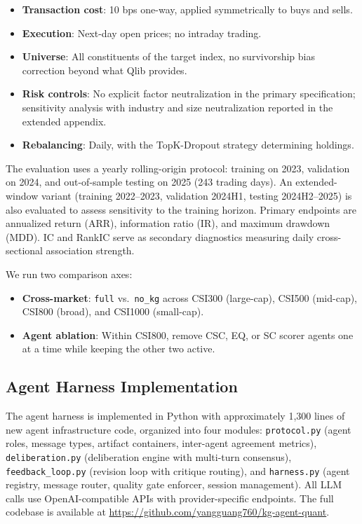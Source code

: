 \documentclass[sigconf]{acmart}
\begin{document}
\begin{itemize}
    \item \textbf{Transaction cost}: 10 bps one-way, applied symmetrically to buys and sells.
    \item \textbf{Execution}: Next-day open prices; no intraday trading.
    \item \textbf{Universe}: All constituents of the target index, no survivorship bias correction beyond what Qlib provides.
    \item \textbf{Risk controls}: No explicit factor neutralization in the primary specification; sensitivity analysis with industry and size neutralization reported in the extended appendix.
    \item \textbf{Rebalancing}: Daily, with the TopK-Dropout strategy determining holdings.
\end{itemize}

The evaluation uses a yearly rolling-origin protocol: training on 2023, validation on 2024, and out-of-sample testing on 2025 (243 trading days). An extended-window variant (training 2022--2023, validation 2024H1, testing 2024H2--2025) is also evaluated to assess sensitivity to the training horizon. Primary endpoints are annualized return (ARR), information ratio (IR), and maximum drawdown (MDD). IC and RankIC serve as secondary diagnostics measuring daily cross-sectional association strength.

We run two comparison axes:
\begin{itemize}
    \item \textbf{Cross-market}: \texttt{full} vs.\ \texttt{no\_kg} across CSI300 (large-cap), CSI500 (mid-cap), CSI800 (broad), and CSI1000 (small-cap).
    \item \textbf{Agent ablation}: Within CSI800, remove CSC, EQ, or SC scorer agents one at a time while keeping the other two active.
\end{itemize}

\subsection{Agent Harness Implementation}

The agent harness is implemented in Python with approximately 1,300 lines of new agent infrastructure code, organized into four modules: \texttt{protocol.py} (agent roles, message types, artifact containers, inter-agent agreement metrics), \texttt{deliberation.py} (deliberation engine with multi-turn consensus), \texttt{feedback\_loop.py} (revision loop with critique routing), and \texttt{harness.py} (agent registry, message router, quality gate enforcer, session management). All LLM calls use OpenAI-compatible APIs with provider-specific endpoints. The full codebase is available at \url{https://github.com/yangguang760/kg-agent-quant}.
\end{document}
